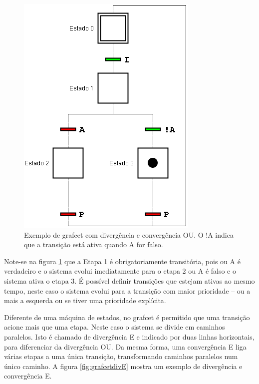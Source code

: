 \begin{figure}[hbt]
  \centering
  \includegraphics[scale=0.6]{figuras/grafcetdivOU}
  \caption{Exemplo de grafcet com divergência e convergência OU. O !A indica que a transição está ativa quando A for falso.}
  \label{fig:grafcetdivOU}
\end{figure}

Note-se na figura \ref{fig:grafcetdivOU} que a Etapa 1 é obrigatoriamente transitória, pois ou A é verdadeiro e o sistema evolui imediatamente para o etapa 2 ou A é falso e o sistema ativa o etapa 3. É possível definir transições que estejam ativas ao mesmo tempo, neste caso o sistema evolui para a transição com maior prioridade -- ou a mais a esquerda ou se tiver uma prioridade explícita.

Diferente de uma máquina de estados, no grafcet é permitido que uma transição acione mais que uma etapa. Neste caso o sistema se divide em caminhos paralelos. Isto é chamado de divergência E e indicado por duas linhas horizontais, para diferenciar da divergência OU. Da mesma forma, uma convergência E liga várias etapas a uma única transição, transformando caminhos paralelos num único caminho. A figura \ref{fig:grafcetdivE} mostra um exemplo de divergência e convergência E.

